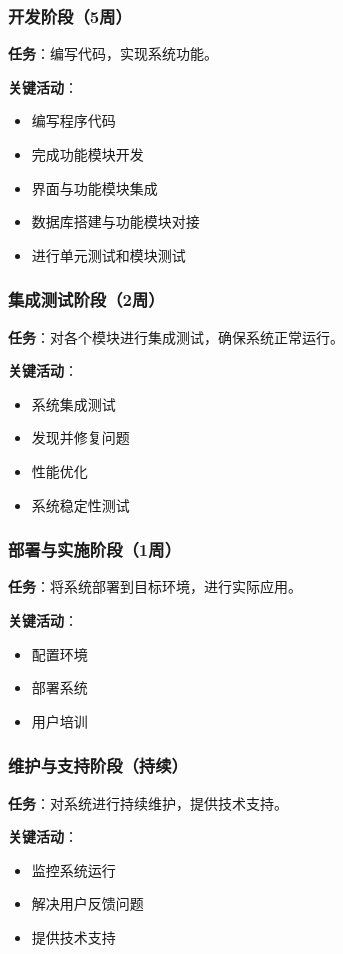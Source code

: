 \subsubsection{开发阶段（5周）}
\textbf{任务}：编写代码，实现系统功能。

\textbf{关键活动}：
\begin{itemize}[itemsep=2pt,topsep=0pt,parsep=0pt,itemindent=1em]
    \item 编写程序代码
    \item 完成功能模块开发
    \item 界面与功能模块集成
    \item 数据库搭建与功能模块对接
    \item 进行单元测试和模块测试
\end{itemize}


\subsubsection{集成测试阶段（2周）}
\textbf{任务}：对各个模块进行集成测试，确保系统正常运行。

\textbf{关键活动}：
\begin{itemize}[itemsep=2pt,topsep=0pt,parsep=0pt,itemindent=1em]
    \item 系统集成测试
    \item 发现并修复问题
    \item 性能优化
    \item 系统稳定性测试
\end{itemize}


\subsubsection{部署与实施阶段（1周）}
\textbf{任务}：将系统部署到目标环境，进行实际应用。

\textbf{关键活动}：
\begin{itemize}[itemsep=2pt,topsep=0pt,parsep=0pt,itemindent=1em]
    \item 配置环境
    \item 部署系统
    \item 用户培训
\end{itemize}


\subsubsection{维护与支持阶段（持续）}
\textbf{任务}：对系统进行持续维护，提供技术支持。

\textbf{关键活动}：
\begin{itemize}[itemsep=2pt,topsep=0pt,parsep=0pt,itemindent=1em]
    \item 监控系统运行
    \item 解决用户反馈问题
    \item 提供技术支持
\end{itemize}

